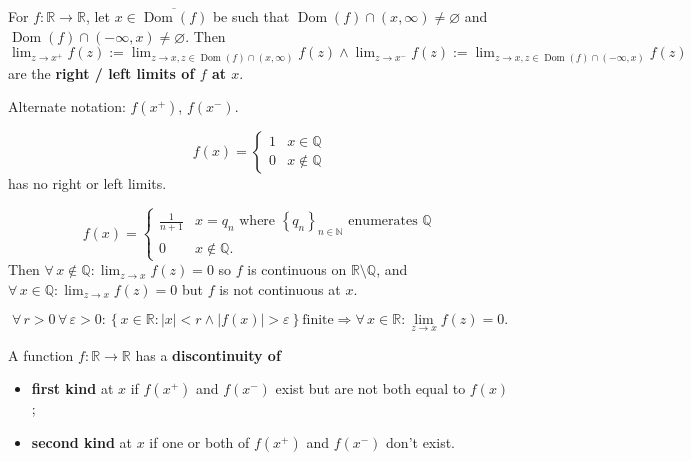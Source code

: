 \documentclass{notes}
\begin{document}
  \begin{defn}
    For $f \colon \mathbb R \to \mathbb R$, let $x \in \overline{\operatorname{Dom}(f)}$ be such that $\operatorname{Dom}(f) \cap (x, \infty) \neq \varnothing$ and $\operatorname{Dom}(f) \cap (-\infty, x) \neq \varnothing$.
    Then $\lim_{z \to x^+} f(z) := \lim_{z \to x, z \in \operatorname{Dom}(f) \cap (x, \infty)} f(z) \land \lim_{z \to x^-} f(z) := \lim_{z \to x, z \in \operatorname{Dom}(f) \cap (-\infty, x)} f(z)$ are the \textbf{right / left limits of $f$ at $x$}.

    Alternate notation: $f(x^+)$, $f(x^-)$.
  \end{defn}
  
  \newpage
  
  \begin{eg}
    \begin{equation}
      f(x) = \begin{cases}
        1 & x \in \mathbb Q \\ 
        0 & x \not \in \mathbb Q
      \end{cases}
    \end{equation}
    has no right or left limits.
  \end{eg}
  
  \begin{eg}
    \begin{equation}
      f(x) = \begin{cases}
        \frac{1}{n + 1} & x = q_n \text{ where $\left \{ q_n \right \}_{n \in \mathbb N}$ enumerates $\mathbb Q$} \\ 
        0 & x \not \in \mathbb Q.
      \end{cases}
    \end{equation}
    Then $\forall \, x \not \in \mathbb Q: \lim_{z \to x} f(z) = 0$ so $f$ is continuous on $\mathbb R \setminus \mathbb Q$, and $\forall \, x \in \mathbb Q: \lim_{z \to x} f(z) = 0$ but $f$ is not continuous at $x$.
  \end{eg}
  
  \begin{lem}
    \[
      \forall \, r > 0 \, \forall \, \varepsilon > 0: \left \{ x \in \mathbb R : \left | x \right | < r \land \left | f(x) \right | > \varepsilon \right \} \text{finite} \Rightarrow \forall \, x \in \mathbb R: \lim_{z \to x} f(z) = 0.
    \]
  \end{lem}
  
  \begin{defn}
    A function $f \colon \mathbb R \to \mathbb R$ has a \textbf{discontinuity of }
    \begin{itemize}
      \item \textbf{first kind} at $x$ if $f(x^+)$ and $f(x^-)$ exist but are not both equal to $f(x)$; 

      \item \textbf{second kind} at $x$ if one or both of $f(x^+)$ and $f(x^-)$ don't exist.
    \end{itemize}
  \end{defn}
  
\end{document}
